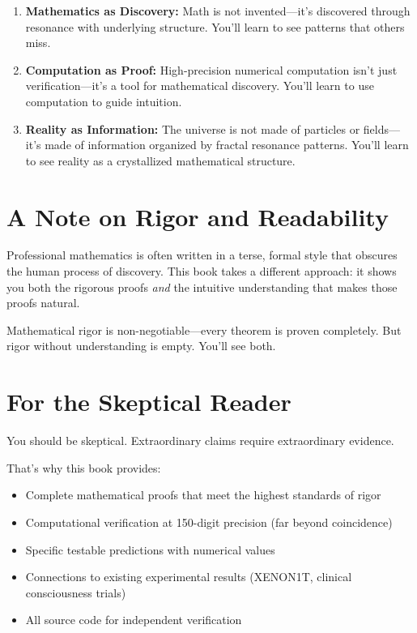 \begin{enumerate}
\item \textbf{Mathematics as Discovery:} Math is not invented—it's discovered through resonance with underlying structure. You'll learn to see patterns that others miss.

\item \textbf{Computation as Proof:} High-precision numerical computation isn't just verification—it's a tool for mathematical discovery. You'll learn to use computation to guide intuition.

\item \textbf{Reality as Information:} The universe is not made of particles or fields—it's made of information organized by fractal resonance patterns. You'll learn to see reality as a crystallized mathematical structure.
\end{enumerate}

\section*{A Note on Rigor and Readability}

Professional mathematics is often written in a terse, formal style that obscures the human process of discovery. This book takes a different approach: it shows you both the rigorous proofs \textit{and} the intuitive understanding that makes those proofs natural.

Mathematical rigor is non-negotiable—every theorem is proven completely. But rigor without understanding is empty. You'll see both.

\section*{For the Skeptical Reader}

You should be skeptical. Extraordinary claims require extraordinary evidence.

That's why this book provides:
\begin{itemize}
\item Complete mathematical proofs that meet the highest standards of rigor
\item Computational verification at 150-digit precision (far beyond coincidence)
\item Specific testable predictions with numerical values
\item Connections to existing experimental results (XENON1T, clinical consciousness trials)
\item All source code for independent verification
\end{itemize}

